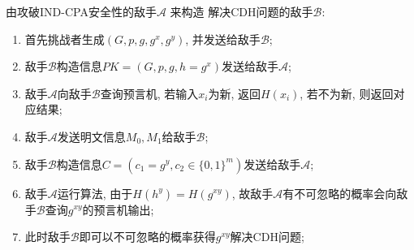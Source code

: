 \documentclass[a4paper,12pt]{ctexart}
\begin{document}

  由攻破IND-CPA安全性的敌手$\mathcal{A}$ 来构造 解决CDH问题的敌手$\mathcal{B}$:
  \begin{enumerate}
    \item 首先挑战者生成$(G,p,g,g^x,g^y)$, 并发送给敌手$\mathcal{B}$;
    \item 敌手$\mathcal{B}$构造信息$PK=(G,p,g,h=g^x)$发送给敌手$\mathcal{A}$;
    \item 敌手$\mathcal{A}$向敌手$\mathcal{B}$查询预言机, 若输入$x_i$为新, 返回$H(x_i)$, 若不为新, 则返回对应结果;
    \item 敌手$\mathcal{A}$发送明文信息$M_0,M_1$给敌手$\mathcal{B}$;
    \item 敌手$\mathcal{B}$构造信息$C=(c_1=g^y,c_2\in \{0,1\}^m)$发送给敌手$\mathcal{A}$;
    \item 敌手$\mathcal{A}$运行算法, 由于$H(h^y)=H(g^{xy})$, 故敌手$\mathcal{A}$有不可忽略的概率会向敌手$\mathcal{B}$查询$g^{xy}$的预言机输出;
    \item 此时敌手$\mathcal{B}$即可以不可忽略的概率获得$g^{xy}$解决CDH问题;
  \end{enumerate}
    
\end{document}
